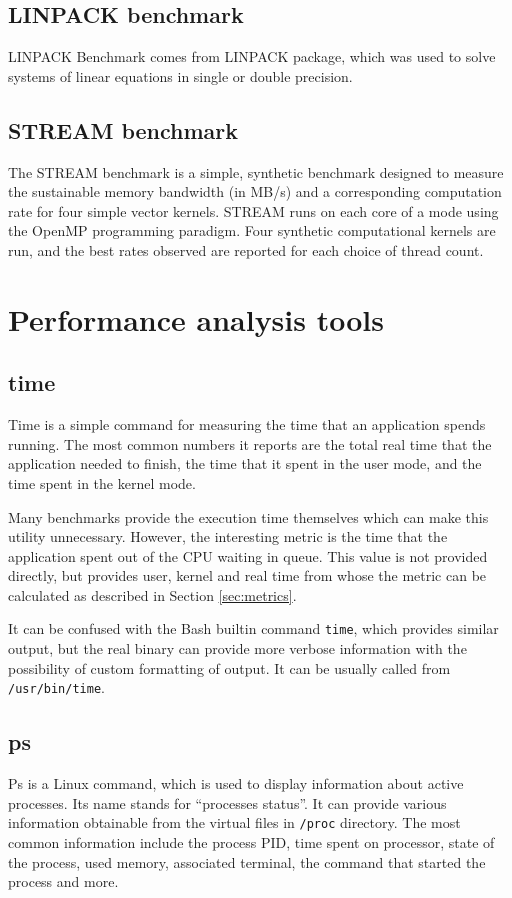 \subsection{LINPACK benchmark}
LINPACK Benchmark\cite{linpack} comes from LINPACK package, which was used to solve systems of linear equations in single or double precision.

\subsection{STREAM benchmark}
The STREAM benchmark is a simple, synthetic benchmark designed to measure the sustainable memory bandwidth (in MB/s) and a corresponding computation rate for four simple vector kernels.
STREAM runs on each core of a mode using the OpenMP programming paradigm. Four synthetic computational kernels are run, and the best rates observed are reported for each choice of thread count.

\section{Performance analysis tools}

\subsection{time}
Time is a simple command for measuring the time that an application spends
running. The most common numbers it reports are the total real time that the
application needed to finish, the time that it spent in the user mode, and the
time spent in the kernel mode.

Many benchmarks provide the execution time themselves which can make this
utility unnecessary. However, the interesting metric is the time that the
application spent out of the CPU waiting in queue. This value is not provided
directly, but provides user, kernel and real time from whose the metric can be
calculated as described in Section \ref{sec:metrics}.

It can be confused with the Bash builtin command \texttt{time}, which provides similar
output, but the real binary can provide more verbose information with
the possibility of custom formatting of output. It can be usually called from
\texttt{/usr/bin/time}.

\subsection{ps}
Ps is a Linux command, which is used to display information about active processes. Its name
stands for ``processes status''. It can provide various information obtainable from
the virtual files in \texttt{/proc} directory. The most common information
include the process PID, time spent on processor, state of the process, used memory,
associated terminal, the command that started the process and more.

